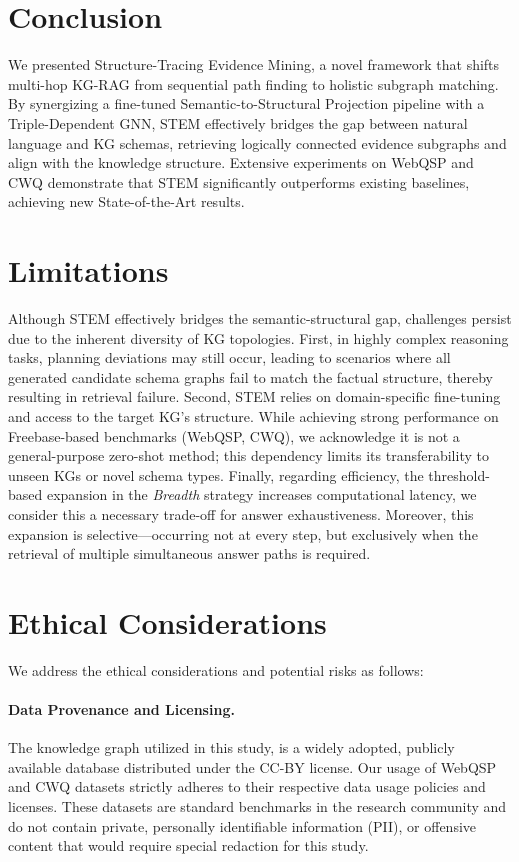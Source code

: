 \documentclass[11pt]{article}
\begin{document}
\section{Conclusion}
We presented Structure-Tracing Evidence Mining, a novel framework that shifts multi-hop KG-RAG from sequential path finding to holistic subgraph matching. By synergizing a fine-tuned Semantic-to-Structural Projection pipeline with a Triple-Dependent GNN, STEM effectively bridges the gap between natural language and KG schemas, retrieving logically connected evidence subgraphs and align with the knowledge structure. Extensive experiments on WebQSP and CWQ demonstrate that STEM significantly outperforms existing baselines, achieving new State-of-the-Art results. 

\section*{Limitations}
Although STEM effectively bridges the semantic-structural gap, challenges persist due to the inherent diversity of KG topologies. First, in highly complex reasoning tasks, planning deviations may still occur, leading to scenarios where all generated candidate schema graphs fail to match the factual structure, thereby resulting in retrieval failure. Second, STEM relies on domain-specific fine-tuning and access to the target KG's structure. While achieving strong performance on Freebase-based benchmarks (WebQSP, CWQ), we acknowledge it is not a general-purpose zero-shot method; this dependency limits its transferability to unseen KGs or novel schema types. Finally, regarding efficiency, the threshold-based expansion in the \textit{Breadth} strategy increases computational latency, we consider this a necessary trade-off for answer exhaustiveness. Moreover, this expansion is selective—occurring not at every step, but exclusively when the retrieval of multiple simultaneous answer paths is required. 

\section*{Ethical Considerations}

We address the ethical considerations and potential risks as follows:

\paragraph{Data Provenance and Licensing.}
The knowledge graph utilized in this study, is a widely adopted, publicly available database distributed under the CC-BY license. Our usage of WebQSP and CWQ datasets strictly adheres to their respective data usage policies and licenses. These datasets are standard benchmarks in the research community and do not contain private, personally identifiable information (PII), or offensive content that would require special redaction for this study.
\end{document}
